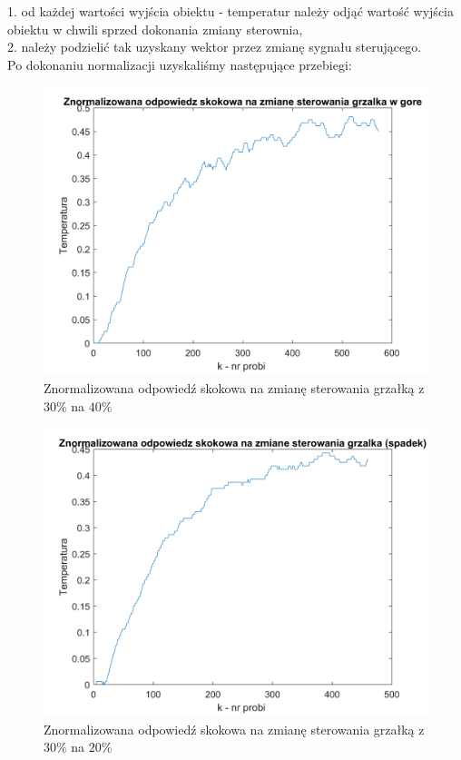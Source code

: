 \documentclass[12pt, a4paper]{article}
\begin{document}
1. od każdej wartości wyjścia obiektu - temperatur należy odjąć wartość wyjścia obiektu w chwili sprzed dokonania zmiany sterownia,\\
2. należy podzielić tak uzyskany wektor przez zmianę sygnału sterującego.\\
Po dokonaniu normalizacji uzyskaliśmy następujące przebiegi:
\begin{figure}[H]
	\centering
	\includegraphics[width=0.9\linewidth]{nor_od_skok_gg}
	\caption{Znormalizowana odpowiedź skokowa na zmianę sterowania grzałką z $30\%$ na $40\%$}
	\label{fig:nosgg}
\end{figure}
\begin{figure}[H]
	\centering
	\includegraphics[width=0.9\linewidth]{nor_od_skok_gd}
	\caption{Znormalizowana odpowiedź skokowa na zmianę sterowania grzałką z $30\%$ na $20\%$}
	\label{fig:nosgd}
\end{figure}
\end{document}
